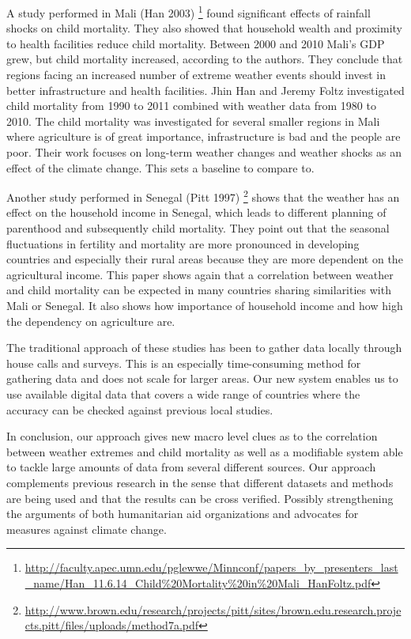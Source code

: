 \documentclass[
10pt, %
a4paper, %
oneside, %
headinclude,footinclude, %
useAMS,
usenatbib
]{template/mn2e}  %
\begin{document}
A study performed in Mali (Han 2003)
\footnote{\url{http://faculty.apec.umn.edu/pglewwe/Minnconf/papers_by_presenters_last_name/Han_11.6.14_Child\%20Mortality\%20in\%20Mali_HanFoltz.pdf}} found significant effects of rainfall shocks on child mortality. They also showed that household wealth and proximity to health facilities reduce child mortality. Between 2000 and 2010 Mali's GDP grew, but child mortality increased, according to the authors. They conclude that regions facing an increased number of extreme weather events should invest in better infrastructure and health facilities. Jhin Han and Jeremy Foltz investigated child mortality from 1990 to 2011 combined with weather data from 1980 to 2010. The child mortality was investigated for several smaller regions in Mali where agriculture is of great importance, infrastructure is bad and the people are poor. Their work focuses on long-term weather changes and weather shocks as an effect of the climate change. This sets a baseline to compare to.


Another study performed in Senegal (Pitt 1997)
\footnote{\url{http://www.brown.edu/research/projects/pitt/sites/brown.edu.research.projects.pitt/files/uploads/method7a.pdf}} shows that the weather has an effect on the household income in Senegal, which leads to different planning of parenthood and subsequently child mortality. They point out that the seasonal fluctuations in fertility and mortality are more pronounced in developing countries and especially their rural areas because they are more dependent on the agricultural income. This paper shows again that a correlation between weather and child mortality can be expected in many countries sharing similarities with Mali or Senegal. It also shows how importance of household income and how high the dependency on agriculture are.

The traditional approach of these studies has been to gather data locally through house calls and surveys. This is an especially time-consuming method for gathering data and does not scale for larger areas. Our new system enables us to use available digital data that covers a wide range of countries where the accuracy can be checked against previous local studies.

In conclusion, our approach gives new macro level clues as to the correlation between weather extremes and child mortality as well as a modifiable system able to tackle large amounts of data from several different sources. Our approach complements previous research in the sense that different datasets and methods are being used and that the results can be cross verified. Possibly strengthening the arguments of both humanitarian aid organizations and advocates for measures against climate change.
\end{document}
